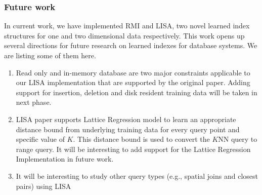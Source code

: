 \subsubsection{Future work}

In current work, we have implemented RMI and LISA, two novel learned index structures
for one and two dimensional data respectively. This work opens up several directions for future research on learned indexes for database systems. We are listing some of them here. 

\begin{enumerate}
	\item Read only and in-memory database are two major constraints applicable to our LISA implementation that are supported by the original paper. Adding support for insertion, deletion and disk resident training data will be taken in next phase.
	\item LISA paper supports Lattice Regression model to learn an appropriate distance bound from underlying training data for every query point and specific value of $K$. This distance bound is used to convert the $K$NN query to range query. It will be interesting to add support for the Lattice Regression Implementation in future work. 
	\item It will be interesting to study other query types (e.g., spatial joins and closest pairs) using LISA
	
\end{enumerate}